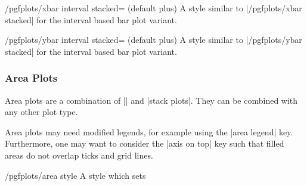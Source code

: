\begin{stylekey}{/pgfplots/xbar interval stacked= (default plus)}
	A style similar to |/pgfplots/xbar stacked| for the interval based bar plot variant.
\end{stylekey}
\begin{stylekey}{/pgfplots/ybar interval stacked= (default plus)}
	A style similar to |/pgfplots/ybar stacked| for the interval based bar plot variant.
\end{stylekey}

\subsubsection{Area Plots}
Area plots are a combination of |\closedcycle| and |stack plots|. They can be combined with any other plot type.

\begin{codeexample}[]
\end{codeexample}
\noindent
Area plots may need modified legends, for example using the |area legend| key. Furthermore, one may want to consider the |axis on top| key such that filled areas do not overlap ticks and grid lines. 

\begin{stylekey}{/pgfplots/area style}
	A style which sets
\begin{codeexample}
\end{codeexample}
\end{stylekey}

\begin{codeexample}[]
\end{codeexample}

